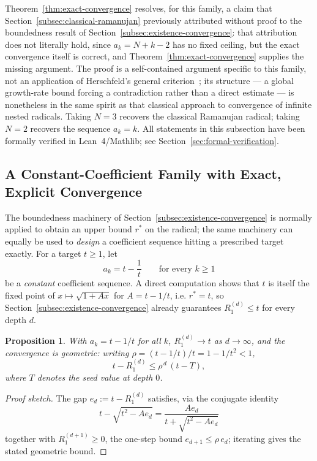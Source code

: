 \documentclass[11pt,a4paper]{amsart}
\theoremstyle{plain}
\newtheorem{proposition}[theorem]{Proposition}
\theoremstyle{definition}
\theoremstyle{remark}
\begin{document}
Theorem~\ref{thm:exact-convergence} resolves, for this family, a claim that Section~\ref{subsec:classical-ramanujan} previously attributed without proof to the boundedness result of Section~\ref{subsec:existence-convergence}: that attribution does not literally hold, since $a_k = N+k-2$ has no fixed ceiling, but the exact convergence itself is correct, and Theorem~\ref{thm:exact-convergence} supplies the missing argument. The proof is a self-contained argument specific to this family, not an application of Herschfeld's general criterion~\cite{Herschfeld1935}; its structure — a global growth-rate bound forcing a contradiction rather than a direct estimate — is nonetheless in the same spirit as that classical approach to convergence of infinite nested radicals. Taking $N=3$ recovers the classical Ramanujan radical; taking $N=2$ recovers the sequence $a_k=k$. All statements in this subsection have been formally verified in Lean~4/Mathlib; see Section~\ref{sec:formal-verification}.

\subsection{A Constant-Coefficient Family with Exact, Explicit Convergence}
\label{subsec:target-radical}

The boundedness machinery of Section~\ref{subsec:existence-convergence} is normally applied to obtain an upper bound $r^\ast$ on the radical; the same machinery can equally be used to \emph{design} a coefficient sequence hitting a prescribed target exactly. For a target $t \ge 1$, let
\[
a_k = t - \frac{1}{t} \qquad \text{for every } k \ge 1
\]
be a \emph{constant} coefficient sequence. A direct computation shows that $t$ is itself the fixed point of $x \mapsto \sqrt{1+Ax}$ for $A = t-1/t$, i.e. $r^\ast = t$, so Section~\ref{subsec:existence-convergence} already guarantees $R_1^{(d)} \le t$ for every depth $d$.

\begin{proposition}
\label{prop:target-radical}
With $a_k = t - 1/t$ for all $k$, $R_1^{(d)} \to t$ as $d \to \infty$, and the convergence is geometric: writing $\rho = (t-1/t)/t = 1 - 1/t^2 < 1$,
\[
t - R_1^{(d)} \le \rho^{\,d}\,(t - T),
\]
where $T$ denotes the seed value at depth $0$.
\end{proposition}

\begin{proof}[Proof sketch]
The gap $e_d := t - R_1^{(d)}$ satisfies, via the conjugate identity
\[
t - \sqrt{t^2 - A e_d} = \frac{A e_d}{t + \sqrt{t^2 - Ae_d}}
\]
together with $R_1^{(d+1)} \ge 0$, the one-step bound $e_{d+1} \le \rho\, e_d$; iterating gives the stated geometric bound. \qedhere
\end{proof}
\end{document}
